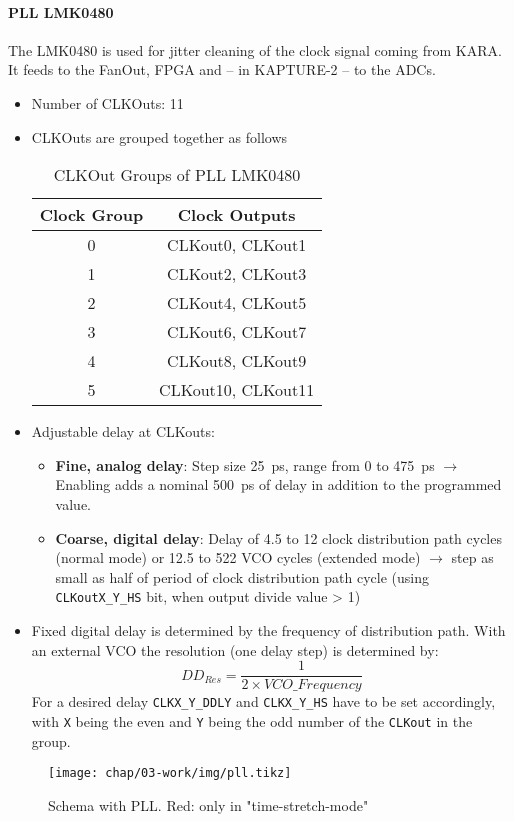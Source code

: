 \paragraph{PLL LMK0480}
The LMK0480 is used for jitter cleaning of the clock signal coming from KARA. It feeds to the FanOut, FPGA and -- in KAPTURE-2 -- to the ADCs.
\begin{itemize}
	\item Number of CLKOuts: 11
	\item CLKOuts are grouped together as follows
	\begin{table}[tbh!]
	\caption{CLKOut Groups of PLL LMK0480}
	\label{tab:pll}
	\begin{minipage}{\textwidth}
		\centering
		\begin{tabularx}{0.5\textwidth}{cc}
			\toprule
			\textbf{Clock Group} & \textbf{Clock Outputs} \\
				\midrule
			0	& CLKout0, CLKout1\\
			1	& CLKout2, CLKout3\\
			2	& CLKout4, CLKout5\\
			3	& CLKout6, CLKout7\\
			4	& CLKout8, CLKout9\\
			5	& CLKout10, CLKout11\\
			\bottomrule
		\end{tabularx}
	\end{minipage}
\end{table}
	\item Adjustable delay at CLKouts: 
	\begin{itemize}
		\item \textbf{Fine, analog delay}: Step size \SI{25}{\pico\second}, range from 0 to \SI{475}{\pico \second} \newline 
		$\rightarrow$ Enabling adds a nominal \SI{500}{\pico\second} of delay in addition to the programmed value.
		\item \textbf{Coarse, digital delay}: Delay of 4.5 to 12 clock distribution path cycles (normal mode) or 12.5 to 522 VCO cycles (extended mode) $\rightarrow$ step as small as half of period of clock distribution path cycle (using \texttt{CLKoutX\_Y\_HS} bit, when output divide value > 1)
	\end{itemize}

\item Fixed digital delay is determined by the frequency of distribution path. With an external VCO the resolution (one delay step) is determined by: 
	\begin{equation}
		DD_{Res}=\frac{1}{2\times VCO\_Frequency}
	\end{equation}
	For a desired delay \texttt{CLKX\_Y\_DDLY} and \texttt{CLKX\_Y\_HS} have to be set accordingly, with \texttt{X} being the even and \texttt{Y} being the odd number of the \texttt{CLKout} in the group.
\end{itemize}


\begin{figure}[H]
	\centering
	\texttt{[image: chap/03-work/img/pll.tikz]}
	\caption{Schema with PLL. Red: only in "time-stretch-mode"}
	\label{fig:pll}
\end{figure}